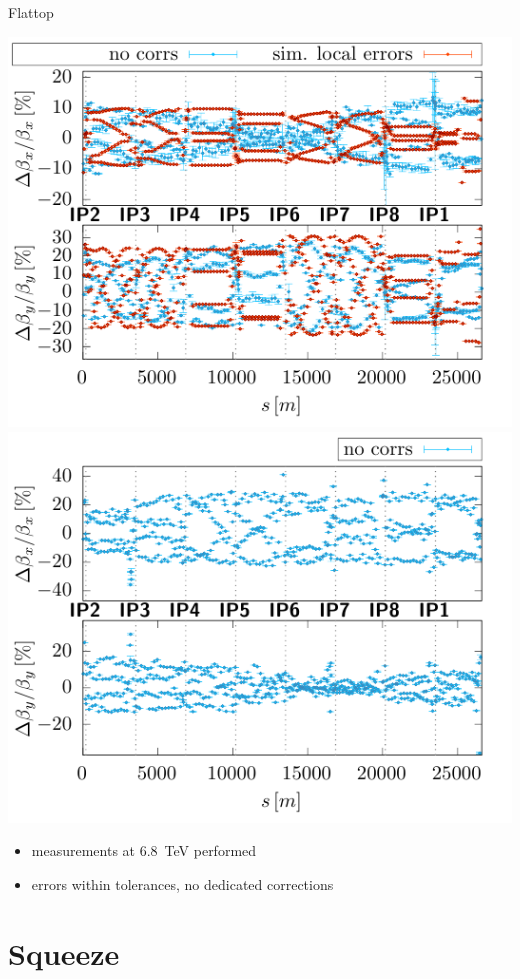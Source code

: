 \documentclass[11pt,usenames,dvipsnames,aspectratio=169]{beamer}
\begin{document}
\begin{frame}{Flattop}
    
    \includegraphics[width=0.49\linewidth]{images/flattop/b1_bb.pdf}
    \hfill
    \includegraphics[width=0.49\linewidth]{images/flattop/b2_bb.pdf}
    \begin{itemize}
        \item measurements at \SI{6.8}{TeV} performed
        \item errors within tolerances, no dedicated corrections
    \end{itemize}
    
\end{frame}

\section{Squeeze}
\end{document}
